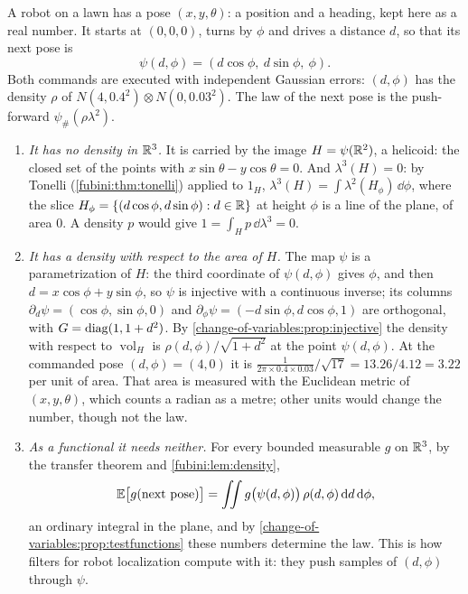 \begin{notechapter}
\begin{example}\label{change-of-variables:ex:robot}
A robot on a lawn has a pose $(x, y, \theta)$: a position and a heading,
kept here as a real number. It starts at $(0, 0, 0)$, turns by
$\phi$ and drives a distance $d$, so that its next pose is
\[
  \psi(d, \phi) = (d\cos\phi,\ d\sin\phi,\ \phi) .
\]
Both commands are executed with independent Gaussian errors:
$(d, \phi)$ has the density $\rho$ of $N(4, 0.4^2)\otimes N(0, 0.03^2)$.
The law of the next pose is the push-forward $\psi_\#(\rho\lambda^2)$.
\begin{enumerate}[nosep]
  \item \emph{It has no density in $\mathbb{R}^3$.} It is carried by the image
        $H = \psi(\mathbb{R}^2)$, a helicoid: the closed set of the points with
        $x\sin\theta - y\cos\theta = 0$. And $\lambda^3(H) = 0$: by Tonelli
        (\cref{fubini:thm:tonelli}) applied to $1_H$,
        $\lambda^3(H) = \int\lambda^2(H_\phi)\,\dd\phi$, where the slice
        $H_\phi = \{(d\cos\phi, d\sin\phi) : d\in\mathbb{R}\}$ at height $\phi$
        is a line of the plane, of area $0$. A density $p$ would give
        $1 = \int_Hp\,\dd\lambda^3 = 0$.
  \item \emph{It has a density with respect to the area of $H$.} The
        map $\psi$ is a parametrization of $H$: the third coordinate of
        $\psi(d, \phi)$ gives $\phi$, and then $d = x\cos\phi +
        y\sin\phi$, so $\psi$ is injective with a continuous inverse;
        its columns $\partial_d\psi = (\cos\phi, \sin\phi, 0)$ and
        $\partial_\phi\psi = (-d\sin\phi, d\cos\phi, 1)$ are orthogonal,
        with $G = \operatorname{diag}(1, 1 + d^2)$. By
        \cref{change-of-variables:prop:injective} the density with
        respect to $\operatorname{vol}_H$ is
        $\rho(d, \phi)/\sqrt{1 + d^2}$ at the point $\psi(d, \phi)$. At
        the commanded pose $(d, \phi) = (4, 0)$ it is
        $\frac{1}{2\pi\times0.4\times0.03}/\sqrt{17} = 13.26/4.12 = 3.22$
        per unit of area. That area is measured with the Euclidean
        metric of $(x, y, \theta)$, which counts a radian as a metre;
        other units would change the number, though not the law.
  \item \emph{As a functional it needs neither.} For every bounded
        measurable $g$ on $\mathbb{R}^3$, by the transfer theorem and
        \cref{fubini:lem:density},
        \[
          \mathbb{E}\bigl[g(\text{next pose})\bigr]
          = \iint g\bigl(\psi(d, \phi)\bigr)\,\rho(d, \phi)\,
            \mathrm{d} d\,\mathrm{d}\phi ,
        \]
        an ordinary integral in the plane, and by
        \cref{change-of-variables:prop:testfunctions} these numbers
        determine the law. This is how filters for robot localization
        compute with it: they push samples of $(d, \phi)$ through
        $\psi$.
\end{enumerate}
\end{example}


\end{notechapter}

